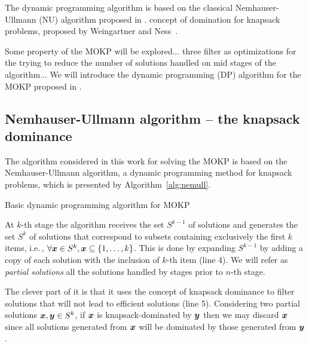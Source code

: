

The dynamic programming algorithm is based on the classical Nemhauser-Ullmann (NU) algorithm proposed
in \cite{nemhauser1969discrete}.
concept of domination for knapsack problems,
proposed by Weingartner and Ness~\cite{weingartner1967methods}.

Some property of the MOKP will be explored...
three filter as optimizations for the trying
to reduce the number of solutions
handled on mid stages of the algorithm...
We will introduce the dynamic programming (DP) algorithm for the MOKP proposed in \cite{bazgan2009}.



\subsection{Nemhauser-Ullmann algorithm -- the knapsack dominance}

The algorithm considered in this work for solving the MOKP is based on the
Nemhauser-Ullmann algorithm, a dynamic programming method for knapsack problems,
which is presented by Algorithm~\ref{alg:nemull}.

\begin{algorithm}
  \caption{Basic dynamic programming algorithm for MOKP}
  \label{alg:nemull}
  
\end{algorithm}

At $k$-th stage the algorithm receives the set $S^{k-1}$ of solutions and
generates the set $S^k$ of solutions that correspond
to subsets containing exclusively the first $k$ items, i.e.\,,
$\forall\boldsymbol{x} \in S^k, \boldsymbol{x} \subseteq \{1, \ldots, k\}$.
This is done by expanding $S^{k-1}$ by adding a copy of each solution with the
inclusion of $k$-th item (line 4).
We will refer as \emph{partial solutions} all the solutions handled by
stages prior to $n$-th stage.

The clever part of it is that it uses the concept of knapsack dominance
to filter solutions that will not lead to efficient solutions (line 5).
Considering two partial solutions $\boldsymbol{x}, \boldsymbol{y} \in S^k$, if
$\boldsymbol{x}$ is knapsack-dominated by $\boldsymbol{y}$ then we may discard $\boldsymbol{x}$ since all
solutions generated from $\boldsymbol{x}$ will be dominated by those generated from $\boldsymbol{y}$.


